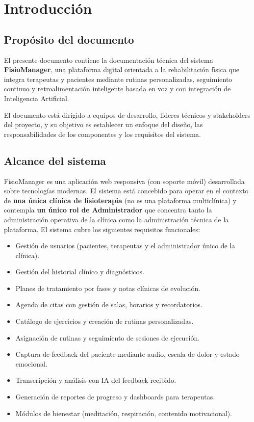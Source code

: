 

\chapter{Introducción}

\section{Propósito del documento}

El presente documento contiene la documentación técnica del sistema \textbf{FisioManager}, una plataforma digital orientada a la rehabilitación física que integra terapeutas y pacientes mediante rutinas personalizadas, seguimiento continuo y retroalimentación inteligente basada en voz y con integración de Inteligencia Artificial.

El documento está dirigido a equipos de desarrollo, lideres técnicos y stakeholders del proyecto, y su objetivo es establecer un enfoque del diseño, las responsabilidades de los componentes y los requisitos del sistema.

\section{Alcance del sistema}

FisioManager es una aplicación web responsiva (con soporte móvil) desarrollada sobre tecnologías modernas. El sistema está concebido para operar en el contexto de \textbf{una única clínica de fisioterapia} (no es una plataforma multiclínica) y contempla \textbf{un único rol de Administrador} que concentra tanto la administración operativa de la clínica como la administración técnica de la plataforma. El sistema cubre los siguientes requisitos funcionales:

\begin{itemize}
  \item Gestión de usuarios (pacientes, terapeutas y el administrador único de la clínica).
  \item Gestión del historial clínico y diagnósticos.
  \item Planes de tratamiento por fases y notas clínicas de evolución.
  \item Agenda de citas con gestión de salas, horarios y recordatorios.
  \item Catálogo de ejercicios y creación de rutinas personalizadas.
  \item Asignación de rutinas y seguimiento de sesiones de ejecución.
  \item Captura de feedback del paciente mediante audio, escala de dolor y estado emocional.
  \item Transcripción y análisis con IA del feedback recibido.
  \item Generación de reportes de progreso y dashboards para terapeutas.
  \item Módulos de bienestar (meditación, respiración, contenido motivacional).
\end{itemize}

